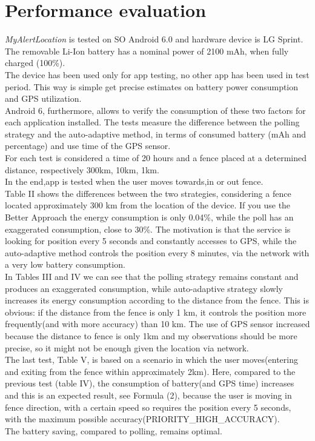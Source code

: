 \documentclass[conference]{IEEEtran}
\begin{document}
\section{Performance evaluation}
\textit{MyAlertLocation} is tested on SO Android 6.0 and hardware device is LG Sprint. The removable Li-Ion battery has a nominal power of 2100 mAh, when fully charged (100\%). \\
The device has been used only for app testing, no other app has been used in test period. This way is simple get precise estimates on battery power consumption and GPS utilization. \\
Android 6, furthermore, allows to verify the consumption of these two factors for each application installed.
The tests measure the difference between the polling strategy and the auto-adaptive method, in terms of consumed battery (mAh and percentage) and use time of the GPS sensor. \\
For each test is considered a time of 20 hours and a fence placed at a determined distance, respectively 300km, 10km, 1km.\\ 
In the end,app is tested when the user moves towards,in or out fence.\\
Table II shows the differences between the two strategies, considering a fence located approximately 300 km from the location of the device.
If you use the Better Approach the energy consumption is only 0.04\%, while the poll has an exaggerated consumption, close to 30\%.
The motivation is that the service is looking for position every 5 seconds and constantly accesses to GPS, 
while the auto-adaptive method controls the position every 8 minutes, via the network with a very low battery consumption. \\
In Tables III and IV we can see that the polling strategy remains constant and produces an exaggerated consumption, 
while auto-adaptive strategy slowly increases its energy consumption according to the distance from the fence.
This is obvious: if the distance from the fence is only 1 km, it controls the position more frequently(and with more accuracy) than 10 km.
The use of GPS sensor increased because the distance to fence is only 1km and my observations should be more precise, so it might not be enough given the location via network.\\
The last test, Table V, is based on a scenario in which the user moves(entering and exiting from the fence within approximately 2km). Here, compared to the previous test (table IV), 
the consumption of battery(and GPS time) increases and this is an expected result, see Formula (2), because the user is moving in fence direction, with a certain speed so
requires the position every 5 seconds, with the maximum possible accuracy(PRIORITY\_HIGH\_ACCURACY).\\
The battery saving, compared to polling, remains optimal.
\end{document}

